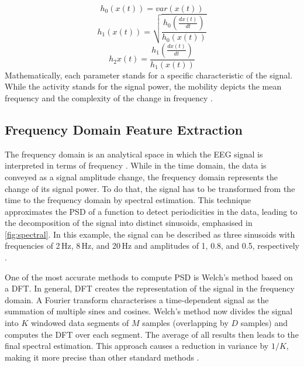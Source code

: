       \begin{equation}
        h_{0}(x(t)) = var(x(t)) \label{eq:h0}
      \end{equation}
      \begin{equation}
        h_{1}(x(t)) = \sqrt{\frac{h_0(\frac{dx(t)}{dt})}{h_{0}(x(t))}} \label{eq:h1}
      \end{equation}
      \begin{equation}
        h_{2}{x(t)} = \frac{h_{1}(\frac{dx(t)}{dt})}{h_{1}(x(t))} \label{eq:h2}
      \end{equation}
      Mathematically, each parameter stands for a specific characteristic of the signal. While the activity stands for the signal power, the mobility depicts the mean frequency and the complexity of the change in frequency \cite{vidaurre2009time}.
    \subsection{Frequency Domain Feature Extraction}
      The frequency domain is an analytical space in which the \ac{EEG} signal is interpreted in terms of frequency \cite{cui2022review}. While in the time domain, the data is conveyed as a signal amplitude change, the frequency domain represents the change of its signal power. To do that, the signal has to be transformed from the time to the frequency domain by spectral estimation. This technique approximates the \ac{PSD} of a function to detect periodicities in the data, leading to the decomposition of the signal into distinct sinusoids, emphasised in \autoref{fig:spectral}. In this example, the signal can be described as three sinusoids with frequencies of 2\,Hz, 8\,Hz, and 20\,Hz and amplitudes of 1, 0.8, and 0.5, respectively \cite{hu2019eeg}. \par
      One of the most accurate methods to compute \ac{PSD} is Welch's method based on a \ac{DFT}. In general, \ac{DFT} creates the representation of the signal in the frequency domain. A Fourier transform characterises a time-dependent signal as the summation of multiple sines and cosines. Welch's method now divides the signal into $K$ windowed data segments of $M$ samples (overlapping by $D$ samples) and computes the \ac{DFT} over each segment. The average of all results then leads to the final spectral estimation. This approach causes a reduction in variance by $1/K$, making it more precise than other standard methods \cite{hu2019eeg}. \par

